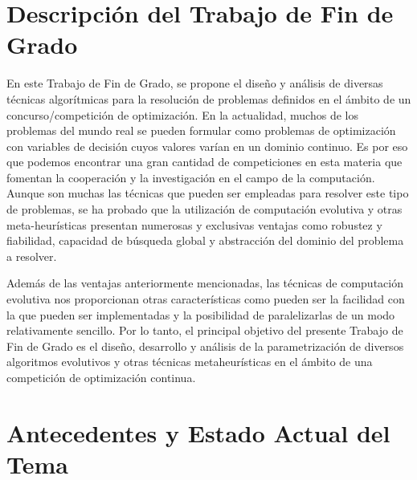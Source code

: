 
\section{Descripción del Trabajo de Fin de Grado}
\label{sec:DESCRIPTION}

En este Trabajo de Fin de Grado, se propone el diseño y análisis de diversas técnicas algorítmicas para la resolución de problemas definidos en el ámbito de un concurso/competición de optimización.
	En la actualidad,  muchos de los problemas del mundo real se pueden formular como problemas de optimización con variables de decisión cuyos valores varían en un dominio continuo. Es por eso que podemos encontrar una gran cantidad de competiciones en esta materia que fomentan la cooperación y la investigación en el campo de la computación. Aunque son muchas las técnicas que pueden ser empleadas para resolver este tipo de problemas, se ha probado que la utilización de computación evolutiva y otras meta-heurísticas presentan numerosas y exclusivas ventajas como robustez y fiabilidad, capacidad de búsqueda global y abstracción del dominio del problema a resolver.

Además de las ventajas anteriormente mencionadas, las técnicas de computación evolutiva nos proporcionan otras características como pueden ser la facilidad con la que pueden ser implementadas y la posibilidad de paralelizarlas de un modo relativamente sencillo.
	Por lo tanto, el principal objetivo del presente Trabajo de Fin de Grado es el diseño, desarrollo y análisis de la parametrización de diversos algoritmos evolutivos y otras técnicas metaheurísticas en el ámbito de una competición de optimización continua. 
\section{Antecedentes y Estado Actual del Tema}
\label{sec:SUBJECT}

